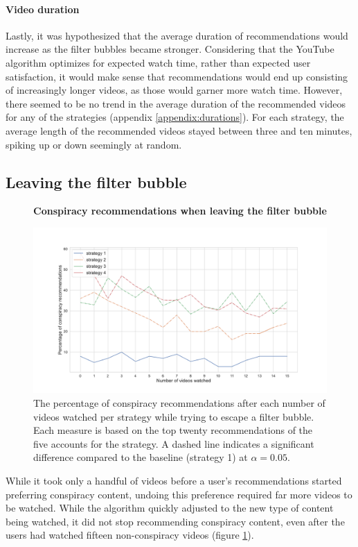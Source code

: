 \documentclass[../main.tex]{subfiles}
\begin{document}
\paragraph{Video duration}
Lastly, it was hypothesized that the average duration of recommendations would increase as the filter bubbles
became stronger. Considering that the YouTube algorithm optimizes for expected watch time, rather than expected
user satisfaction, it would make sense that recommendations would end up consisting of increasingly longer
videos, as those would garner more watch time. However, there seemed to be no trend in the average duration of
the recommended videos for any of the strategies (appendix \ref{appendix:durations}). For each strategy, the
average length of the recommended videos stayed between three and ten minutes, spiking up or down seemingly at
random.

\subsection{Leaving the filter bubble}

\begin{figure}[t]
  \textbf{Conspiracy recommendations when leaving the filter bubble}\par\medskip
  \centering
  \includegraphics[keepaspectratio, width=\textwidth]{images/conspiracy_recs_2.pdf}
  \caption{The percentage of conspiracy recommendations after each number of videos watched per strategy while trying to escape a filter bubble. Each measure is based on the top twenty recommendations of the five accounts for the strategy. A dashed line indicates a significant difference compared to the baseline (strategy 1) at $\alpha = 0.05$.}
  \label{fig:con_recs_2}
\end{figure}

While it took only a handful of videos before a user's recommendations started preferring conspiracy content, 
undoing this preference required far more videos to be watched. While the algorithm quickly adjusted to the 
new type of content being watched, it did not stop recommending conspiracy content, even after the users had
watched fifteen non-conspiracy videos (figure \ref{fig:con_recs_2}). 
\end{document}

